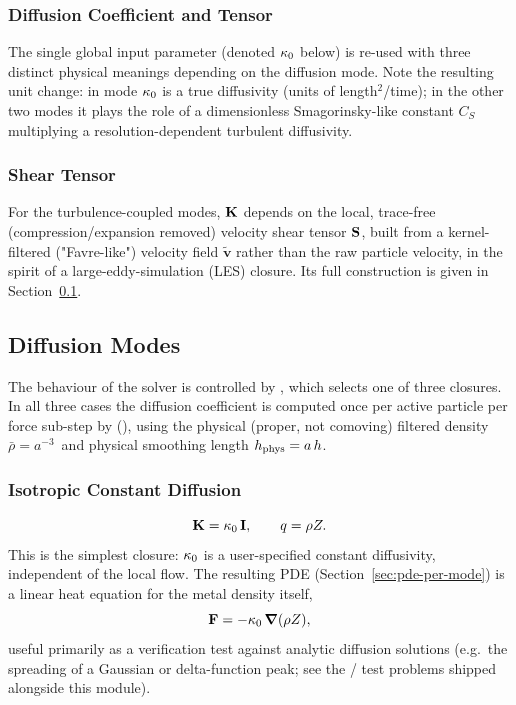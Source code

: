 \subsubsection{Diffusion Coefficient and Tensor}
\label{sec:diffusion-tensor}
The single global input parameter 
(denoted $\kappa_{0}$ below) is re-used with three distinct physical
meanings depending on the diffusion mode. Note the resulting unit
change: in  mode $\kappa_{0}$ is a true diffusivity
(units of length$^2$/time); in the other two modes it plays the role of a
dimensionless Smagorinsky-like constant $C_S$ multiplying a
resolution-dependent turbulent diffusivity.

\subsubsection{Shear Tensor}
\label{sec:shear-tensor}
For the turbulence-coupled modes, $\mathbf{K}$ depends on the local,
trace-free (compression/expansion removed) velocity shear tensor
$\mathbf{S}$, built from a kernel-filtered ("Favre-like") velocity field
$\tilde{\mathbf v}$ rather than the raw particle velocity, in the spirit
of a large-eddy-simulation (LES) closure. Its full construction is given
in Section~\ref{sec:diffusion-modes}.

\subsection{Diffusion Modes}
\label{sec:diffusion-modes}

The behaviour of the solver is controlled by
,
which selects one of three closures. In all three cases the diffusion
coefficient is computed once per active particle per force sub-step by
(), using the physical (proper, not
comoving) filtered density $\bar\rho = a^{-3}\,$
and physical smoothing length $h_{\rm phys} = a\,h$.

\subsubsection{Isotropic Constant Diffusion}
\begin{equation}
  \mathbf{K} = \kappa_{0} \, \mathbf I , \qquad q = \rho Z .
\end{equation}
This is the simplest closure: $\kappa_{0}$ is a user-specified constant
diffusivity, independent of the local flow. The resulting PDE
(Section~\ref{sec:pde-per-mode}) is a linear heat equation for
the metal density itself,
\begin{equation}
  \mathbf{F} = -\kappa_{0} \,\grad(\rho Z) ,
\end{equation}
useful primarily as a verification test against analytic diffusion
solutions (e.g.\ the spreading of a Gaussian or delta-function peak; see
the / test
problems shipped alongside this module).

